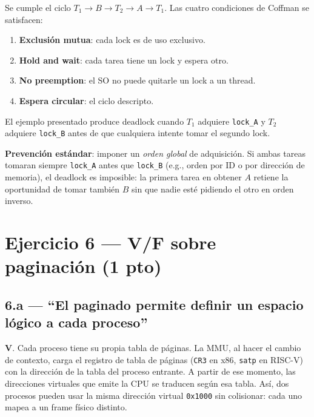 \documentclass[11pt,a4paper]{article}
\begin{document}
Se cumple el ciclo $T_1 \to B \to T_2 \to A \to T_1$. Las cuatro
condiciones de Coffman se satisfacen:

\begin{enumerate}[leftmargin=*,nosep]
    \item \textbf{Exclusión mutua}: cada lock es de uso exclusivo.
    \item \textbf{Hold and wait}: cada tarea tiene un lock y espera
        otro.
    \item \textbf{No preemption}: el SO no puede quitarle un lock a
        un thread.
    \item \textbf{Espera circular}: el ciclo descripto.
\end{enumerate}

\begin{respuesta}
El ejemplo presentado produce deadlock cuando $T_1$ adquiere
\texttt{lock\_A} y $T_2$ adquiere \texttt{lock\_B} antes de que
cualquiera intente tomar el segundo lock.

\textbf{Prevención estándar}: imponer un \emph{orden global} de
adquisición. Si ambas tareas tomaran siempre \texttt{lock\_A} antes
que \texttt{lock\_B} (e.g., orden por ID o por dirección de memoria),
el deadlock es imposible: la primera tarea en obtener $A$ retiene la
oportunidad de tomar también $B$ sin que nadie esté pidiendo el otro
en orden inverso.
\end{respuesta}

\section{Ejercicio 6 --- V/F sobre paginación (1 pto)}

\subsection*{6.a --- ``El paginado permite definir un espacio lógico a cada proceso''}

\begin{respuesta}
\textbf{V}. Cada proceso tiene su propia tabla de páginas. La MMU,
al hacer el cambio de contexto, carga el registro de tabla de
páginas (\texttt{CR3} en x86, \texttt{satp} en RISC-V) con la
dirección de la tabla del proceso entrante. A partir de ese momento,
las direcciones virtuales que emite la CPU se traducen según esa
tabla. Así, dos procesos pueden usar la misma dirección virtual
\texttt{0x1000} sin colisionar: cada uno mapea a un frame físico
distinto.
\end{respuesta}
\end{document}
